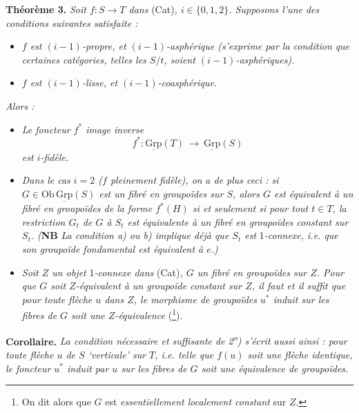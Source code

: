 \documentclass[11pt]{article}
\newcommand{\printedpage}[1]{\marginpar{\footnotesize p.~#1}}
\newcommand{\msp}[1]{\marginpar{\footnotesize [#1]}}
\newcommand{\uGrp}{\underline{\mathrm{Grp}}}
\newcommand{\fl}{\longrightarrow}
\begin{document}
\textbf{Théorème 3.} \textit{Soit $f : S \fl T$ dans} (Cat)\textit{, $i \in \{0,1,2\}$. Supposons l'une des conditions suivantes satisfaite :}

\begin{itemize}[leftmargin=3em]
\item[\textit{a)}] \textit{$f$ est $(i-1)$-propre, et $(i-1)$-asphérique (s'exprime par la condition que certaines catégories, telles les $S/t$, soient $(i-1)$-asphériques).}
\item[\textit{b)}] \textit{$f$ est $(i-1)$-lisse, et $(i-1)$-coasphérique.}
\end{itemize}

\textit{Alors :}

\begin{itemize}[leftmargin=3em]
\item[\textit{1\textsuperscript{o})}] \textit{Le foncteur $f^*$ image inverse}
\[
f^* : \uGrp(T) \ \fl\ \uGrp(S)
\]
\textit{est $i$-fidèle.}
\item[\textit{2\textsuperscript{o})}] \textit{Dans le cas $i = 2$ ($f$ pleinement fidèle), on}
\printedpage{8}
\msp{page 9}
\textit{a de plus ceci : si $G \in \mathrm{Ob}\,\uGrp(S)$ est un fibré en groupoïdes sur $S$, alors $G$ est équivalent à un fibré en groupoïdes de la forme $f^*(H)$ si et seulement si pour tout $t \in T$, la restriction $G_t$ de $G$ à $S_t$ est équivalente à un fibré en groupoïdes constant sur $S_t$. (}\textbf{NB} \textit{La condition a) ou b) implique déjà que $S_t$ est} 1\textit{-connexe, i.e. que son groupoïde fondamental est équivalent à $e$.)}
\item[\textit{3\textsuperscript{o})}] \textit{Soit $Z$ un objet} 1\textit{-connexe dans} (Cat)\textit{, $G$ un fibré en groupoïdes sur $Z$. Pour que $G$ soit $Z$-équivalent à un groupoïde constant sur $Z$, il faut et il suffit que pour toute flèche $u$ dans $Z$, le morphisme de groupoïdes $u^*$ induit sur les fibres de $G$ soit une $Z$-équivalence} (\footnote[3]{On dit alors que $G$ est \textit{essentiellement localement constant} sur $Z$.}).
\end{itemize}

\textbf{Corollaire.} \textit{La condition nécessaire et suffisante de 2\textsuperscript{o}) s'écrit aussi ainsi : pour toute flèche $u$ de $S$ ‘verticale’ sur $T$, i.e. telle que $f(u)$ soit une flèche identique, le foncteur $u^*$ induit par $u$ sur les fibres de $G$ soit une équivalence de groupoïdes.}

\printedpage{[non numérotée]}
\end{document}
